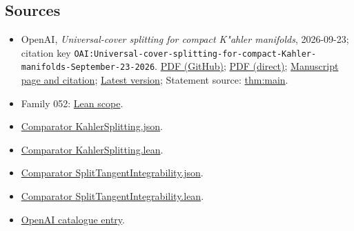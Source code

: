 \documentclass[11pt]{article}
\begin{document}
\subsection{Sources}
\begin{itemize}
\item OpenAI, \emph{Universal-cover splitting for compact K"ahler manifolds}, 2026-09-23; citation key \texttt{OAI:Universal-cover-splitting-for-compact-Kahler-manifolds-September-23-2026}. \href{https://github.com/openai/math/blob/adc7f1241b42e322a6451854ab7e4b4c146bf78a/preprints/Universal-cover-splitting-for-compact-Kahler-manifolds-September-23-2026/paper.pdf}{PDF (GitHub)}; \href{https://github.com/openai/math/raw/adc7f1241b42e322a6451854ab7e4b4c146bf78a/preprints/Universal-cover-splitting-for-compact-Kahler-manifolds-September-23-2026/paper.pdf}{PDF (direct)}; \href{https://github.com/openai/math/blob/adc7f1241b42e322a6451854ab7e4b4c146bf78a/preprints/Universal-cover-splitting-for-compact-Kahler-manifolds-September-23-2026/README.md}{Manuscript page and citation}; \href{https://github.com/openai/math/blob/main/preprints/Universal-cover-splitting-for-compact-Kahler-manifolds-September-23-2026/paper.pdf}{Latest version}; Statement source: \href{https://github.com/openai/math/blob/adc7f1241b42e322a6451854ab7e4b4c146bf78a/preprints/Universal-cover-splitting-for-compact-Kahler-manifolds-September-23-2026/build/intro.tex\#L100}{thm:main}.
\item Family 052: \href{https://github.com/openai/math/blob/adc7f1241b42e322a6451854ab7e4b4c146bf78a/lean/docs/052.md}{Lean scope}.
\item \href{https://github.com/openai/math/blob/adc7f1241b42e322a6451854ab7e4b4c146bf78a/lean/ComparatorChallenges/KahlerSplitting.json}{Comparator KahlerSplitting.json}.
\item \href{https://github.com/openai/math/blob/adc7f1241b42e322a6451854ab7e4b4c146bf78a/lean/ComparatorChallenges/KahlerSplitting.lean}{Comparator KahlerSplitting.lean}.
\item \href{https://github.com/openai/math/blob/adc7f1241b42e322a6451854ab7e4b4c146bf78a/lean/ComparatorChallenges/SplitTangentIntegrability.json}{Comparator SplitTangentIntegrability.json}.
\item \href{https://github.com/openai/math/blob/adc7f1241b42e322a6451854ab7e4b4c146bf78a/lean/ComparatorChallenges/SplitTangentIntegrability.lean}{Comparator SplitTangentIntegrability.lean}.
\item \href{https://github.com/openai/math/blob/adc7f1241b42e322a6451854ab7e4b4c146bf78a/CONTENTS.md}{OpenAI catalogue entry}.
\end{itemize}
\end{document}
